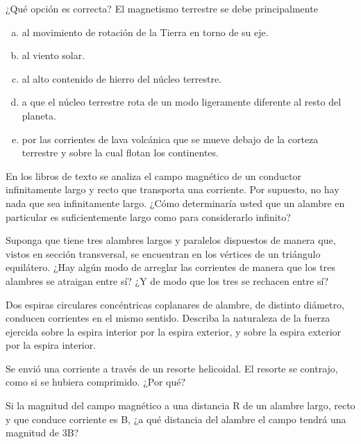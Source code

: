 %
\begin{Exercise}
    ¿Qué opción es correcta? El magnetismo terrestre se debe principalmente
    \begin{enumerate}[a)]
        \item al movimiento de rotación de la Tierra en torno de su eje.
        \item al viento solar.
        \item al alto contenido de hierro del núcleo terrestre.
        \item a que el núcleo terrestre rota de un modo ligeramente diferente al resto del planeta.
        \item por las corrientes de lava volcánica que se mueve debajo de la corteza terrestre y sobre la cual flotan los continentes.
    \end{enumerate}
\end{Exercise}
%
\begin{Exercise}
    En los libros de texto se analiza el campo magnético de un conductor infinitamente largo y recto que transporta una corriente. Por supuesto, no hay nada que sea infinitamente largo. ¿Cómo determinaría usted que un alambre en particular es suficientemente largo como para considerarlo infinito?
\end{Exercise}
%
\begin{Exercise}
    Suponga que tiene tres alambres largos y paralelos dispuestos de manera que, vistos en sección
    transversal, se encuentran en los vértices de un triángulo equilátero. ¿Hay algún modo de arreglar las corrientes de manera que los tres alambres se atraigan entre sí? ¿Y de modo que los tres se rechacen entre sí?
\end{Exercise}
%
\begin{Exercise}
    Dos espiras circulares concéntricas coplanares de alambre, de distinto diámetro, conducen corrientes en el mismo sentido. Describa la naturaleza de la fuerza ejercida sobre la espira interior por la espira exterior, y sobre la espira exterior por la espira interior.
\end{Exercise}
%
\begin{Exercise}
    Se envió una corriente a través de un resorte helicoidal. El resorte se contrajo, como si se hubiera comprimido. ¿Por qué?
\end{Exercise}
%
\begin{Exercise}
    Si la magnitud del campo magnético a una distancia R de un alambre largo, recto y que conduce
    corriente es B, ¿a qué distancia del alambre el campo tendrá una magnitud de 3B?
\end{Exercise}
